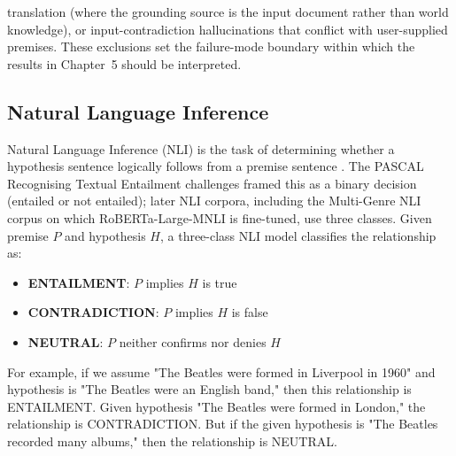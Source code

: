 translation (where the grounding source is the input document rather than world knowledge), or input-contradiction hallucinations that conflict with user-supplied premises. These exclusions set the failure-mode boundary within which the results in Chapter~5 should be interpreted.

\subsection{Natural Language Inference}

Natural Language Inference (NLI) is the task of determining whether a hypothesis sentence logically follows from a premise sentence \cite{barhaim2006second}. The PASCAL Recognising Textual Entailment challenges framed this as a binary decision (entailed or not entailed); later NLI corpora, including the Multi-Genre NLI corpus on which RoBERTa-Large-MNLI is fine-tuned, use three classes. Given premise $P$ and hypothesis $H$, a three-class NLI model classifies the relationship as:
\begin{itemize}
    \item \textbf{ENTAILMENT}: $P$ implies $H$ is true
    \item \textbf{CONTRADICTION}: $P$ implies $H$ is false  
    \item \textbf{NEUTRAL}: $P$ neither confirms nor denies $H$
\end{itemize}

For example, if we assume "The Beatles were formed in Liverpool in 1960" and hypothesis is "The Beatles were an English band," then this relationship is ENTAILMENT. Given hypothesis "The Beatles were formed in London," the relationship is CONTRADICTION. But if the given hypothesis is "The Beatles recorded many albums," then the relationship is NEUTRAL.

